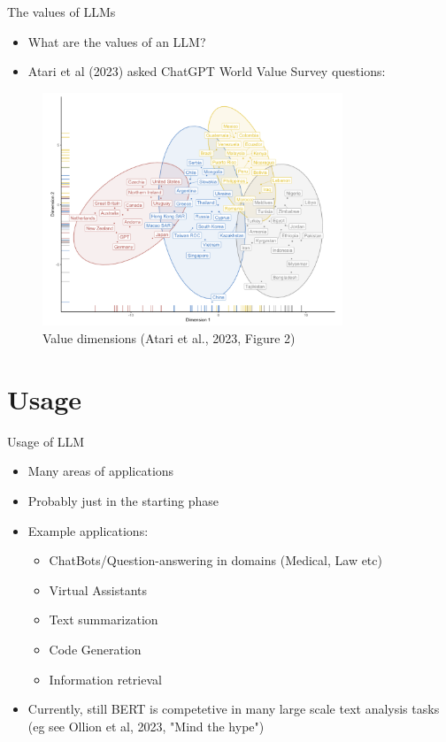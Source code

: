 \documentclass[10pt]{beamer}
\begin{document}
\begin{frame}{The values of LLMs}

\begin{itemize}
\item What are the values of an LLM?
\item Atari et al (2023) asked ChatGPT World Value Survey questions:
\end{itemize}
\pause
\begin{figure}[h]
\centering
\includegraphics[width=0.8\textwidth]{fig/atari_2023_fig2}
\caption{Value dimensions (Atari et al., 2023, Figure 2)}
\end{figure}


\end{frame}


\section{Usage}

\begin{frame}{Usage of LLM}
\begin{itemize}
\item Many areas of applications
\item Probably just in the starting phase
\item Example applications:
\begin{itemize}
\item ChatBots/Question-answering in domains (Medical, Law etc)
\item Virtual Assistants
\item Text summarization
\item Code Generation
\item Information retrieval
\end{itemize}
\item Currently, still BERT is competetive in many large scale text analysis tasks (eg see Ollion et al, 2023, "Mind the hype")
\end{itemize}

\end{frame}
\end{document}
